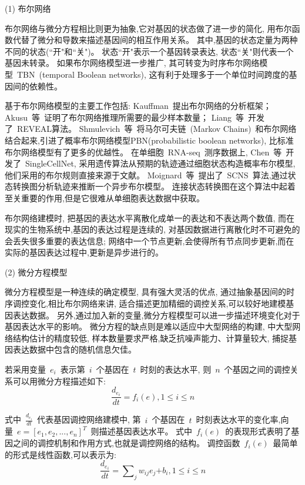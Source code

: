 (1) 布尔网络

布尔网络与微分方程相比则更为抽象,它对基因的状态做了进一步的简化,
用布尔函数代替了微分和导数来描述基因间的相互作用关系。
其中,基因的状态定量为两种不同的状态(``开"和``关")。
状态``开"表示一个基因转录表达, 状态``关"则代表一个基因未转录。
如果布尔网络模型进一步推广, 其可转变为时序布尔网络模型~TBN~(temporal Boolean networks), 这有利于处理多于一个单位时间跨度的基因间的依赖性。

基于布尔网络模型的主要工作包括: Kauffman~\cite{kauffman2003random}提出布尔网络的分析框架；
Akusu~等~\cite{akutsu1999identification}证明了布尔网络推理所需要的最少样本数量；
Liang~等~\cite{liang1998reveal}开发了~REVEAL算法。
Shmulevich~等~\cite{marshall2007inference}将马尔可夫链~(Markov Chains)~和布尔网络结合起来,引进了概率布尔网络模型PBN(probabilistic boolean networks),
比标准布尔网络模型有了更多的优越性。
在单细胞~RNA-seq~测序数据上,
Chen~等~\cite{chen2014single}开发了~SingleCellNet,
采用遗传算法从预期的轨迹通过细胞状态构造概率布尔模型, 他们采用的布尔规则直接来源于文献。
Moignard~等~\cite{moignard2015decoding}提出了~SCNS~算法,通过状态转换图分析轨迹来推断一个异步布尔模型。
连接状态转换图在这个算法中起着至关重要的作用,但是它很难从单细胞表达数据中获取。

布尔网络建模时, 把基因的表达水平离散化成单一的表达和不表达两个数值,
而在现实的生物系统中,基因的表达过程是连续的,
对基因数据进行离散化时不可避免的会丢失很多重要的表达信息;
网络中一个节点更新,会使得所有节点同步更新,而在实际的基因表达过程中,更新是异步进行的。

(2) 微分方程模型

微分方程模型是一种连续的确定模型, 具有强大灵活的优点,
通过抽象基因间的时序调控变化,相比布尔网络来讲, 适合描述更加精细的调控关系,可以较好地建模基因表达数据。
另外,通过加入新的变量,微分方程模型可以进一步描述环境变化对于基因表达水平的影响。
微分方程的缺点则是难以适应中大型网络的构建, 中大型网络结构估计的精度较低,
样本数量要求严格,缺乏抗噪声能力、计算量较大, 捕捉基因表达数据中包含的随机信息欠佳。

若采用变量~$e_i$~表示第~$i$~个基因在~$t$~时刻的表达水平, 则~$n$~个基因之间的调控关系可以用微分方程描述如下:
\begin{equation}
\frac{{d_{e_i}}}{{dt}} = f_i (e),1 \le i \le n
\end{equation}

式中~$\frac{{d_{e_i }}}{{dt}}$~代表基因调控网络建模中,
第~$i$~个基因在~$t$~时刻表达水平的变化率,向量~$e=[e_1,e_2,...,e_n]^T$~则描述基因表达水平。
式中~$f_i(e)$~的表现形式表明了基因之间的调控机制和作用方式,也就是调控网络的结构。
调控函数~$f_i(e)$~最简单的形式是线性函数,可以表示为:
\begin{equation}
\frac{{d_{e_i }}}{{dt}} = \sum\nolimits_j {w_{ij} e_j} { + b_i } ,1 \le i \le n
\end{equation}


